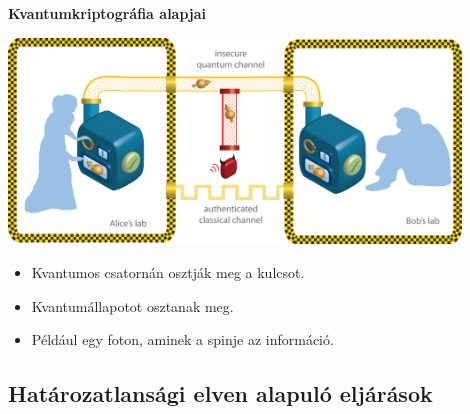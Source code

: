 \documentclass{beamer}
\begin{document}
    \begin{frame}

        \center

        \textbf{Kvantumkriptográfia alapjai}

        \hspace{5pt}

        \includegraphics[width=0.9\textwidth]{quantum_alice_and_bob.jpg}

        \begin{itemize}
            \item Kvantumos csatornán osztják meg a kulcsot.
            \item Kvantumállapotot osztanak meg.
            \item Például egy foton, aminek a spinje az információ.
        \end{itemize}

    \end{frame}

    \subsection{Határozatlansági elven alapuló eljárások}
\end{document}
